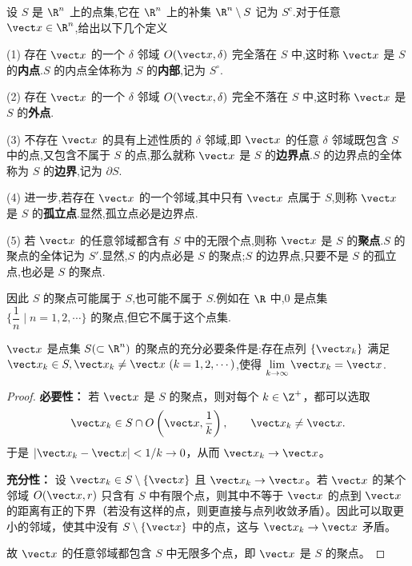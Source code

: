 \begin{definition}
设 $S$ 是 $\R^n$ 上的点集,它在 $\R^n$ 上的补集 $\R^n\setminus S$ 记为 $S^c$.对于任意 $\vect x\in\R^n$,给出以下几个定义

(1) 存在 $\vect x$ 的一个 $\delta$ 邻域 $O(\vect x,\delta)$ 完全落在 $S$ 中,这时称 $\vect x$ 是 $S$ 的\textbf{内点}.$S$ 的内点全体称为 $S$ 的\textbf{内部},记为 $S^\circ$.

(2) 存在 $\vect x$ 的一个 $\delta$ 邻域 $O(\vect x,\delta)$ 完全不落在 $S$ 中,这时称 $\vect x$ 是 $S$ 的\textbf{外点}.

(3) 不存在 $\vect x$ 的具有上述性质的 $\delta$ 邻域,即 $\vect x$ 的任意 $\delta$ 邻域既包含 $S$ 中的点,又包含不属于 $S$ 的点,那么就称 $\vect x$ 是 $S$ 的\textbf{边界点}.$S$ 的边界点的全体称为 $S$ 的\textbf{边界},记为 $\partial S$.

(4) 进一步,若存在 $\vect x$ 的一个邻域,其中只有 $\vect x$ 点属于 $S$,则称 $\vect x$ 是 $S$ 的\textbf{孤立点}.显然,孤立点必是边界点.

(5) 若 $\vect x$ 的任意邻域都含有 $S$ 中的无限个点,则称 $\vect x$ 是 $S$ 的\textbf{聚点}.$S$ 的聚点的全体记为 $S'$.显然,$S$ 的内点必是 $S$ 的聚点;$S$ 的边界点,只要不是 $S$ 的孤立点,也必是 $S$ 的聚点.


\end{definition}
因此 $S$ 的聚点可能属于 $S$,也可能不属于 $S$.例如在 $\R$ 中,$0$ 是点集 $\bigl\{\dfrac1n\mid n=1,2,\cdots\bigr\}$ 的聚点,但它不属于这个点集.
\begin{proposition}
$\vect x$ 是点集 $S(\subset\R^n)$ 的聚点的充分必要条件是:存在点列 $\{\vect x_k\}$ 满足 $\vect x_k\in S,\vect x_k\neq\vect x\ (k=1,2,\cdots)$,使得 $\lim\limits_{k\to\infty}\vect x_k=\vect x$.
\end{proposition}

\begin{proof}
\textbf{必要性：} 若 $\vect x$ 是 $S$ 的聚点，则对每个 $k\in\Z^+$，都可以选取
\[
\vect x_k\in S\cap O\left(\vect x,\frac1k\right),\qquad \vect x_k\neq\vect x.
\]
于是 $|\vect x_k-\vect x|<1/k\to0$，从而 $\vect x_k\to\vect x$。

\textbf{充分性：} 设 $\vect x_k\in S\setminus\{\vect x\}$ 且 $\vect x_k\to\vect x$。若 $\vect x$ 的某个邻域 $O(\vect x,r)$ 只含有 $S$ 中有限个点，则其中不等于 $\vect x$ 的点到 $\vect x$ 的距离有正的下界（若没有这样的点，则更直接与点列收敛矛盾）。因此可以取更小的邻域，使其中没有 $S\setminus\{\vect x\}$ 中的点，这与 $\vect x_k\to\vect x$ 矛盾。

故 $\vect x$ 的任意邻域都包含 $S$ 中无限多个点，即 $\vect x$ 是 $S$ 的聚点。
\end{proof}

